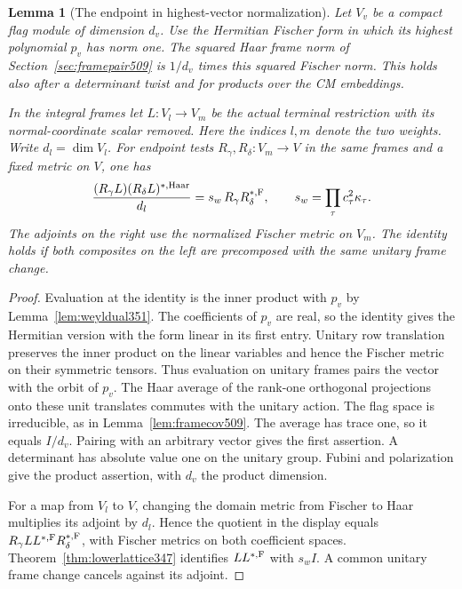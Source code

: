 \documentclass[a4paper,11pt]{article}
\newtheorem{lemma}[proposition]{Lemma}
\theoremstyle{definition}
\theoremstyle{remark}
\numberwithin{equation}{section}
\begin{document}
\begin{lemma}[The endpoint in highest-vector normalization]\leavevmode
\label{lem:frameend512}
Let \(V_v\) be a compact flag module of dimension \(d_v\). Use
the Hermitian Fischer form in which its highest polynomial \(p_v\)
has norm one. The squared Haar frame norm of Section~\ref{sec:framepair509}
is \(1/d_v\) times this squared Fischer norm. This holds also after
a determinant twist and for products over the CM embeddings.

In the integral frames let \(L:V_l\to V_m\) be the actual terminal
restriction with its normal-coordinate scalar removed. Here the
indices \(l,m\) denote the two weights. Write \(d_l=\dim V_l\).
For endpoint tests \(R_\gamma,R_\delta:V_m\to V\) in the same
frames and a fixed metric on \(V\), one has
\[
  \frac{(R_\gamma L)(R_\delta L)^{*,{\rm Haar}}}{d_l}
      =s_w\,R_\gamma R_\delta^{*,{\rm F}},
  \qquad s_w=\prod_\tau c_\tau^2\kappa_\tau .
\]
The adjoints on the right use the normalized Fischer metric on
\(V_m\). The identity holds if both composites on the left are
precomposed with the same unitary frame change.
\end{lemma}
\begin{proof}
Evaluation at the identity is the inner product with \(p_v\)
by Lemma~\ref{lem:weyldual351}. The coefficients of \(p_v\)
are real, so the identity gives the Hermitian version with
the form linear in its first entry. Unitary row translation
preserves the inner product on the linear variables and hence
the Fischer metric on their symmetric tensors. Thus
evaluation on unitary frames pairs the vector with the orbit
of \(p_v\). The Haar average of the rank-one orthogonal
projections onto these unit translates commutes with the
unitary action. The flag space is irreducible, as in
Lemma~\ref{lem:framecov509}. The average has trace one, so it
equals \(I/d_v\). Pairing with an arbitrary vector gives the
first assertion. A determinant has absolute value one on the
unitary group. Fubini and polarization give the product
assertion, with \(d_v\) the product dimension.

For a map from \(V_l\) to \(V\), changing the domain metric
from Fischer to Haar multiplies its adjoint by \(d_l\).
Hence the quotient in the display equals
\(R_\gamma L L^{*,{\rm F}}R_\delta^{*,{\rm F}}\), with Fischer
metrics on both coefficient spaces. Theorem~\ref{thm:lowerlattice347}
identifies \(LL^{*,{\rm F}}\) with \(s_w I\). A common unitary
frame change cancels against its adjoint.
\end{proof}
\end{document}
